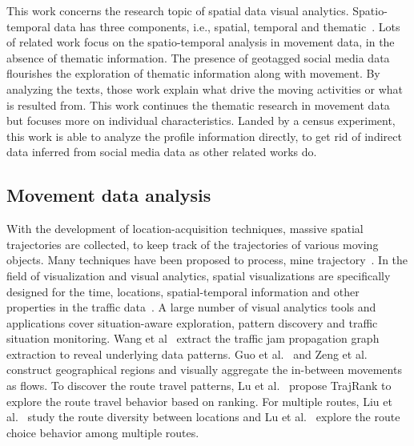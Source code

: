 This work concerns the research topic of spatial data visual analytics. Spatio-temporal data has three components, i.e., spatial, temporal and thematic~\citep{andrienko2013visual}. Lots of related work focus on the spatio-temporal analysis in movement data, in the absence of thematic information. The presence of geotagged social media data flourishes the exploration of thematic information along with movement. By analyzing the texts, those work explain what drive the moving activities or what is resulted from. This work continues the thematic research in movement data but focuses more on individual characteristics. Landed by a census experiment, this work is able to analyze the profile information directly, to get rid of indirect data inferred from social media data as other related works do.

\subsection{Movement data analysis}
 With the development of location-acquisition techniques, massive spatial trajectories are collected, to keep track of the trajectories of various moving objects. Many techniques have been proposed to process, mine trajectory~\citep{Zheng2015_trajectory}. In the field of visualization and visual analytics, spatial visualizations are specifically designed for the time, locations, spatial-temporal information and other properties in the traffic data~\citep{chen2015survey}. A large number of visual analytics tools and applications cover situation-aware exploration, pattern discovery and traffic situation monitoring. Wang et al~\citep{wang2013visual} extract the traffic jam propagation graph extraction to reveal underlying data patterns. Guo et al.~\citep{guo2011tripvista} and Zeng et al.~\citep{zeng2013visualizing} construct geographical regions and visually aggregate the in-between movements as flows. To discover the route travel patterns, Lu et al.~\citep{lu2015trajrank} propose TrajRank to explore the route travel behavior based on ranking. For multiple routes, Liu et al.~\citep{liu2011_routediversity} study the route diversity between locations and Lu et al.~\citep{Lu2017_multipleroute} explore the route choice behavior among multiple routes.

